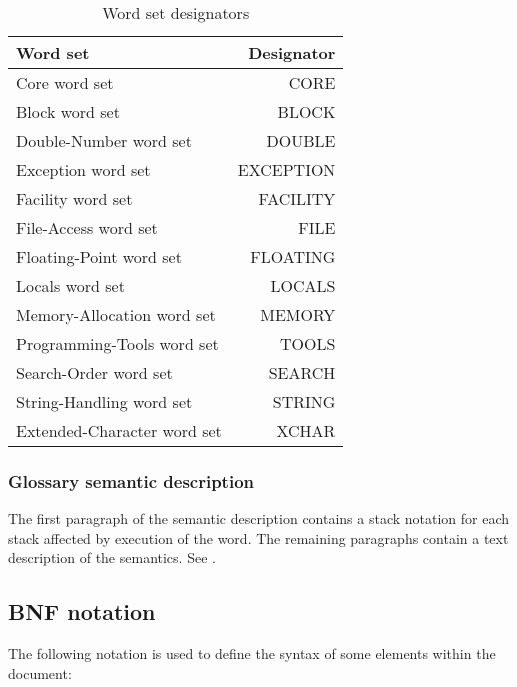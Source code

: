 \begin{table}[ht]
  \begin{center}
	\caption{Word set designators}
	\label{table:wordsets}
	\begin{tabular}{lr}
	\hline\hline
	Word set & Designator \\
	\hline
	Core word set				& CORE			\\
	Block word set				& BLOCK		\\
	Double-Number word set		& DOUBLE		\\
	Exception word set			& EXCEPTION	\\
	Facility word set				& FACILITY		\\
	File-Access word set			& FILE			\\
	Floating-Point word set		& FLOATING		\\
	Locals word set				& LOCALS		\\
	Memory-Allocation word set	& MEMORY		\\
	Programming-Tools word set	& TOOLS		\\
	Search-Order word set		& SEARCH		\\
	String-Handling word set	& STRING			\\
	Extended-Character word set & XCHAR \\
	\hline\hline
	\end{tabular}
  \end{center}
\end{table}

\subsubsection{Glossary semantic description}

The first paragraph of the semantic description contains a stack
notation for each stack affected by execution of the word. The
remaining paragraphs contain a text description of the semantics.
See .

\subsection{BNF notation}
\label{notation:BNF}

The following notation is used to define the syntax of some
elements within the document:

